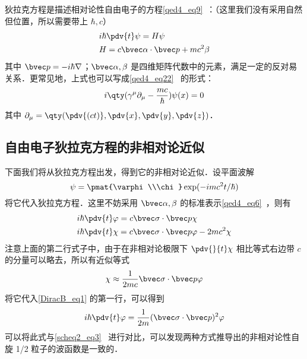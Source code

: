 

狄拉克方程是描述相对论性自由电子的方程\autoref{qed4_eq9}~：（这里我们没有采用自然但位置，所以需要带上 $\hbar,c$）
\begin{equation}
\begin{aligned}
&i\hbar \pdv{t} \psi = H\psi\\
&H=c\bvec \alpha\cdot \bvec p+mc^2\beta
\end{aligned}
\end{equation}
其中 $\bvec p=-i\hbar\nabla$；$\bvec \alpha,\beta$ 是四维矩阵代数中的元素，满足一定的反对易关系．更常见地，上式也可以写成\autoref{qed4_eq22}~ 的形式：
\begin{equation}
i\qty(\gamma^\mu \partial_\mu-\frac{mc}{\hbar})\psi(x)=0
\end{equation}
其中 $\partial_\mu=\qty(\pdv{(ct)},\pdv{x},\pdv{y},\pdv{z})$．

\subsection{自由电子狄拉克方程的非相对论近似}

下面我们将从狄拉克方程出发，得到它的非相对论近似．设平面波解
\begin{equation}
\psi=\pmat{\varphi\\\chi}\exp(-imc^2t/\hbar)
\end{equation}
将它代入狄拉克方程．这里不妨采用 $\bvec \alpha,\beta$ 的标准表示\autoref{qed4_eq6}~，则有
\begin{equation}\label{DiracB_eq1}
\begin{aligned}
&i\hbar\pdv{t} \varphi=c\bvec \sigma\cdot \bvec p \chi\\
&i\hbar\pdv{t} \chi = c\bvec \sigma\cdot \bvec p \varphi -2mc^2 \chi 
\end{aligned}
\end{equation}
注意上面的第二行式子中，由于在非相对论极限下 $\pdv{}{t} \chi$ 相比等式右边带 $c$ 的分量可以略去，所以有近似等式
\begin{equation}
\chi\approx \frac{1}{2mc} \bvec \sigma\cdot \bvec p \varphi
\end{equation}
将它代入\autoref{DiracB_eq1} 的第一行，可以得到
\begin{equation}
i\hbar\pdv{t} \varphi=\frac{1}{2m}(\bvec \sigma\cdot \bvec p)^2 \varphi
\end{equation}
可以将此式与\autoref{scheq2_eq3}~ 进行对比，可以发现两种方式推导出的非相对论性自旋 1/2 粒子的波函数是一致的．
